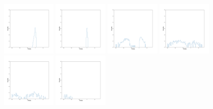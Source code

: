 \documentclass[12pt,prd]{article}
\begin{document}
\begin{figure}[h!]
\includegraphics[width=0.24\textwidth]{../figures/stars_near_zero_rahistgaiascan_l101_2_b58_4_ra212_7_dec55_2_npy_11.pdf}
\includegraphics[width=0.24\textwidth]{../figures/stars_near_zero_rahistgaiascan_l101_2_b58_4_ra212_7_dec55_2_npy_12.pdf}
\includegraphics[width=0.24\textwidth]{../figures/stars_near_zero_rahistgaiascan_l101_2_b58_4_ra212_7_dec55_2_npy_13.pdf}
\includegraphics[width=0.24\textwidth]{../figures/stars_near_zero_rahistgaiascan_l101_2_b58_4_ra212_7_dec55_2_npy_14.pdf}
\includegraphics[width=0.24\textwidth]{../figures/stars_near_zero_rahistgaiascan_l101_2_b58_4_ra212_7_dec55_2_npy_15.pdf}
\includegraphics[width=0.24\textwidth]{../figures/stars_near_zero_rahistgaiascan_l101_2_b58_4_ra212_7_dec55_2_npy_16.pdf}

\end{figure}
\end{document}
